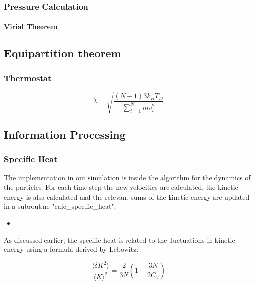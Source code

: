 \documentclass[
10pt, %
a4paper, %
oneside, %
headinclude,footinclude, %
BCOR5mm, %
]{scrartcl}
\newcommand{\insertcode}[2]{\begin{itemize}\item[]\end{itemize}} %
\begin{document}
\subsubsection{Pressure Calculation}

\paragraph{Virial Theorem}

\subsection{Equipartition theorem}

\subsubsection{Thermostat}


\begin{equation} \lambda = \sqrt{ \frac{(N-1) 3 k_BT_D}{ \sum_{i=1}^N mv_i^2} } \end{equation}





\subsection{Information Processing}

\subsubsection{Specific Heat}

The implementation in our simulation is inside the algorithm for the dynamics of the particles. For each time step the new velocities are calculated, the kinetic energy is also calculated and the relevant sums of the kinetic energy are updated in a subroutine "calc\_specific\_heat":

\insertcode{"Scripts/specific_heat_snippet_1.f90"}{Updating the relevant sums of the kinetic energy} %

\noindent
As discussed earlier, the specific heat is related to the fluctuations in kinetic energy using a formula derived by Lebowitz\cite{Duane:1985lz}:

\begin{equation} \frac{\langle\delta K^2\rangle}{\langle K\rangle^2} = \frac{2}{3N} \left ( 1 - \frac{3N}{2C_V} \right ) \end{equation}
\end{document}
